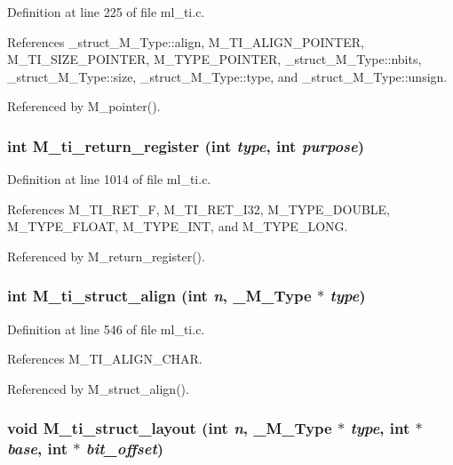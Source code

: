 Definition at line 225 of file ml\_\-ti.c.

References \_\-struct\_\-M\_\-Type::align, M\_\-TI\_\-ALIGN\_\-POINTER, M\_\-TI\_\-SIZE\_\-POINTER, M\_\-TYPE\_\-POINTER, \_\-struct\_\-M\_\-Type::nbits, \_\-struct\_\-M\_\-Type::size, \_\-struct\_\-M\_\-Type::type, and \_\-struct\_\-M\_\-Type::unsign.

Referenced by M\_\-pointer().
\subsubsection{\setlength{\rightskip}{0pt plus 5cm}int M\_\-ti\_\-return\_\-register (int {\em type}, int {\em purpose})}\label{ml__ti_8c_ee0194d8749361e7c94fb0415ac622a2}




Definition at line 1014 of file ml\_\-ti.c.

References M\_\-TI\_\-RET\_\-F, M\_\-TI\_\-RET\_\-I32, M\_\-TYPE\_\-DOUBLE, M\_\-TYPE\_\-FLOAT, M\_\-TYPE\_\-INT, and M\_\-TYPE\_\-LONG.

Referenced by M\_\-return\_\-register().
\subsubsection{\setlength{\rightskip}{0pt plus 5cm}int M\_\-ti\_\-struct\_\-align (int {\em n}, \bf{\_\-M\_\-Type} $\ast$ {\em type})}\label{ml__ti_8c_0ae9b98b22ea0685a343508bfdff0bd1}




Definition at line 546 of file ml\_\-ti.c.

References M\_\-TI\_\-ALIGN\_\-CHAR.

Referenced by M\_\-struct\_\-align().
\subsubsection{\setlength{\rightskip}{0pt plus 5cm}void M\_\-ti\_\-struct\_\-layout (int {\em n}, \bf{\_\-M\_\-Type} $\ast$ {\em type}, int $\ast$ {\em base}, int $\ast$ {\em bit\_\-offset})}\label{ml__ti_8c_0e50d1deae194d6267b5bad9f369dd5c}




